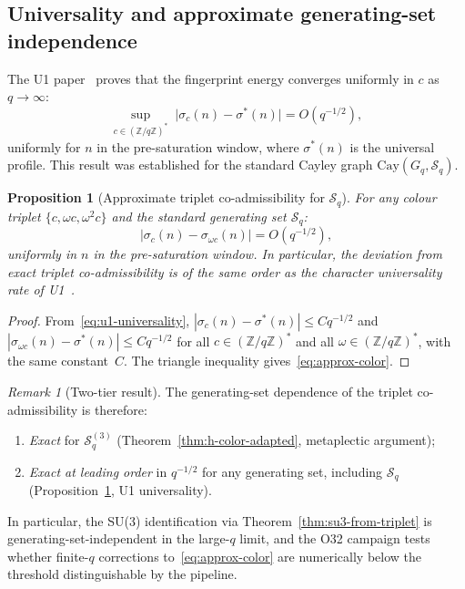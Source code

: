 \documentclass[11pt,a4paper]{article}
\newtheorem{proposition}[theorem]{Proposition}
\theoremstyle{definition}
\theoremstyle{remark}
\newtheorem{remark}[theorem]{Remark}
\newcommand{\Gq}{G_q}
\newcommand{\Z}{\mathbb{Z}}
\newcommand{\Sq}{\mathcal{S}_q}
\begin{document}
    \subsection{Universality and approximate generating-set independence}
      \label{ssec:universality}

      The U1 paper~\cite{Beau2026u1} proves that the fingerprint energy converges uniformly in $c$
      as $q \to \infty$:
      \begin{equation}
        \label{eq:u1-universality}
        \sup_{c \in (\Z/q\Z)^*}\;\bigl|\sigma_c(n) - \sigma^*(n)\bigr| = O(q^{-1/2}),
      \end{equation}
      uniformly for $n$ in the pre-saturation window, where $\sigma^*(n)$ is the universal profile.
      This result was established for the standard Cayley graph $\mathrm{Cay}(\Gq, \Sq)$.

      \begin{proposition}[Approximate triplet co-admissibility for $\Sq$]
        \label{prop:approx-color-admiss}
        For any colour triplet $\{c, \omega c, \omega^2 c\}$ and the standard generating set $\Sq$:
        \begin{equation}
          \label{eq:approx-color}
          |\sigma_c(n) - \sigma_{\omega c}(n)| = O(q^{-1/2}),
        \end{equation}
        uniformly in $n$ in the pre-saturation window.
        In particular, the deviation from exact triplet co-admissibility is of the same order as the
        character universality rate of U1~\cite{Beau2026u1}.
      \end{proposition}

      \begin{proof}
        From~\eqref{eq:u1-universality},
        $|\sigma_c(n) - \sigma^*(n)| \leq C q^{-1/2}$ and
        $|\sigma_{\omega c}(n) - \sigma^*(n)| \leq C q^{-1/2}$
        for all $c \in (\Z/q\Z)^*$ and all $\omega \in (\Z/q\Z)^*$, with the same constant~$C$.
        The triangle inequality gives~\eqref{eq:approx-color}.
      \end{proof}

      \begin{remark}[Two-tier result]
        \label{rmk:two-tier}
        The generating-set dependence of the triplet co-admissibility is therefore:
        \begin{enumerate}[label=(\roman*)]
\item \emph{Exact} for $\Sq^{(3)}$ (Theorem~\ref{thm:h-color-adapted}, metaplectic
argument);
\item \emph{Exact at leading order} in $q^{-1/2}$ for any generating set, including $\Sq$
(Proposition~\ref{prop:approx-color-admiss}, U1 universality).
        \end{enumerate}
        In particular, the SU(3) identification via Theorem~\ref{thm:su3-from-triplet} is
        generating-set-independent in the large-$q$ limit, and the O32 campaign tests whether
        finite-$q$ corrections to~\eqref{eq:approx-color} are numerically below the threshold
        distinguishable by the pipeline.
      \end{remark}
\end{document}
